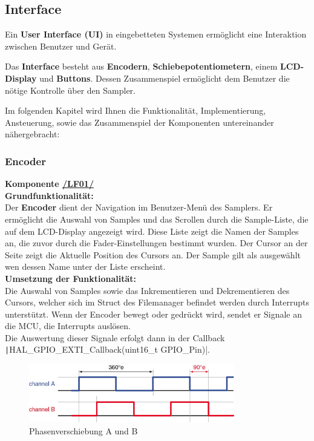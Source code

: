 \subsection{Interface}\label{sec:interface}

Ein\textbf{ User Interface (UI)} in eingebetteten Systemen ermöglicht eine Interaktion zwischen Benutzer und Gerät.

Das \textbf{Interface} besteht aus \textbf{Encodern}, \textbf{Schiebepotentiometern}, einem \textbf{LCD-Display }und \textbf{Buttons}. Dessen Zusammenspiel ermöglicht dem Benutzer die nötige Kontrolle über den Sampler.


Im folgenden Kapitel wird Ihnen die Funktionalität, Implementierung, Ansteuerung, sowie das Zusammenspiel der Komponenten untereinander nähergebracht: 

\subsubsection{Encoder}
\textbf{Komponente \hyperlink{LF01_Link}{/LF01/}} \\

\textbf{Grundfunktionalität:} \\


Der \textbf{Encoder} dient der Navigation im Benutzer-Menü des Samplers. Er ermöglicht die Auswahl von Samples und das Scrollen durch die Sample-Liste, die auf dem LCD-Display angezeigt wird. Diese Liste zeigt die Namen der Samples an, die zuvor durch die Fader-Einstellungen bestimmt wurden. Der Cursor an der Seite zeigt die Aktuelle Position des Cursors an. Der Sample gilt als ausgewählt wen dessen Name unter der Liste erscheint.\\

\textbf{Umsetzung der Funktionalität:} \\

Die Auswahl von Samples sowie das Inkrementieren und Dekrementieren des Cursors, welcher sich im Struct des Filemanager befindet werden durch Interrupts unterstützt. Wenn der Encoder bewegt oder gedrückt wird, sendet er Signale an die MCU, die Interrupts auslösen.\\

Die Auswertung dieser Signale erfolgt dann in der Callback  \texttt|HAL_GPIO_EXTI_Callback(uint16_t GPIO_Pin)|. 

\begin{figure}[H]
	\centering
	\includegraphics[width=0.8\textwidth]{images/08_durchfuehrung/interface/encoder.png}
	\caption{Phasenverschiebung A und B}
	\label{fig:phase_verschiebung}
\end{figure}

